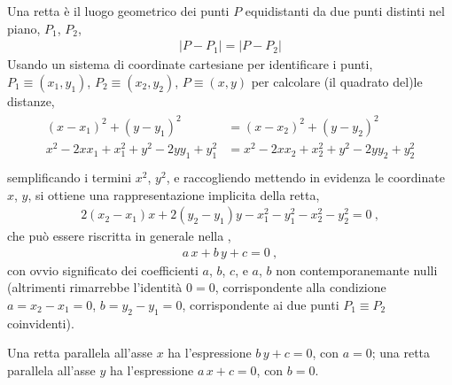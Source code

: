 \documentclass[letterpaper,10pt,italian]{jupyterBook}
\begin{document}
\sphinxAtStartPar
{} Una retta è il luogo geometrico dei punti \(P\) equidistanti da due punti distinti nel piano, \(P_1\), \(P_2\),
\begin{equation*}
\begin{split}|P - P_1| = |P-P_2|\end{split}
\end{equation*}
\sphinxAtStartPar
Usando un sistema di coordinate cartesiane per identificare i punti, \(P_1 \equiv (x_1, y_1)\), \(P_2 \equiv (x_2, y_2)\), \(P \equiv (x,y)\) per calcolare (il quadrato del)le distanze,
\begin{equation*}
\begin{split}\begin{aligned}
 (x - x_1)^2 + (y - y_1)^2 &=  (x - x_2)^2 + (y - y_2)^2 \\
 x^2 - 2 x x_1 + x_1^2 + y^2 - 2 y y_1 + y_1^2 &=  x^2 - 2 x x_2 + x_2^2 + y^2 - 2 y y_2 + y_2^2 \\
\end{aligned}\end{split}
\end{equation*}
\sphinxAtStartPar
semplificando i termini \(x^2\), \(y^2\), e raccogliendo mettendo in evidenza le coordinate \(x\), \(y\), si ottiene una rappresentazione implicita della retta,
\begin{equation*}
\begin{split}  2 ( x_2 - x_1 ) x + 2 ( y_2 - y_1 ) y - x_1^2 - y_1^2 - x_2^2 - y_2^2 = 0 \ ,\end{split}
\end{equation*}
\sphinxAtStartPar
che può essere riscritta in generale nella ,
\begin{equation*}
\begin{split}a \, x + b \, y + c = 0 \ ,\end{split}
\end{equation*}
\sphinxAtStartPar
con ovvio significato dei coefficienti \(a\), \(b\), \(c\), e \(a\), \(b\) non contemporanemante nulli (altrimenti rimarrebbe l’identità \(0 = 0\), corrispondente alla condizione \(a = x_2 - x_1 = 0\), \(b = y_2 - y_1 = 0\), corrispondente ai due punti \(P_1 \equiv P_2\) coinvidenti).

\sphinxAtStartPar
{} Una retta parallela all’asse \(x\) ha l’espressione \(b \, y + c = 0\), con \(a = 0\); una retta parallela all’asse \(y\) ha l’espressione \(a \, x + c = 0\), con \(b=0\).
\end{document}
